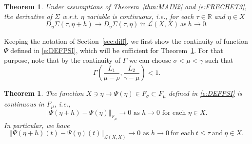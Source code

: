 \documentclass[a4paper,11pt,reqno]{amsart}
\theoremstyle{plain}
\newtheorem{thm}[lem]{Theorem}
\theoremstyle{definition}
\numberwithin{equation}{section}
\newcommand{\R}{\mathbb{R}}
\newcommand{\norm}[1]{\left\Vert#1\right\Vert}
\renewcommand{\leq}{\leqslant}
\begin{document}
\begin{thm}\label{thm:MAIN3}
Under assumptions of Theorem~\ref{thm:MAIN2} and \eqref{e:FRECHET3}, the derivative of $\Sigma$ w.r.t. $\eta$ variable is continuous, i.e., for each $\tau\in\R$ and $\eta\in X$
$$D_\eta\Sigma(\tau,\eta+h)\to D_\eta\Sigma(\tau,\eta)\ \text{in}\ \mathcal{L}(X,X)\ \text{as}\ h\to 0.$$
\end{thm}

Keeping the notation of Section~\ref{sec:diff}, we first show the continuity of function $\Psi$ defined in \eqref{e:DEFPSI}, which will be sufficient for Theorem~\ref{thm:MAIN3}.
For that purpose, note that by the continuity of $\Gamma$ we can choose $\sigma<\mu<\gamma$ such that 
\begin{equation*}%
\Gamma\left(\frac{L_1}{\mu-\rho},\frac{L_2}{\gamma-\mu}\right)<1.
\end{equation*}

\begin{thm}
The function $X\ni \eta\mapsto \Psi(\eta)\in F_\sigma\subset F_\mu$ defined in \eqref{e:DEFPSI} is continuous in $F_\mu$, i.e.,
$$\norm{\Psi(\eta+h)-\Psi(\eta)}_{F_\mu}\to 0\text{ as }h\to0\text{ for each }\eta\in X.$$ 
In particular, we have
\begin{equation}\label{e:CONTINFSIGMA}
\norm{\Psi(\eta+h)(t)-\Psi(\eta)(t)}_{\mathcal{L}(X,X)}\to0\text{ as }h\to0\ \text{for each}\ t\leq\tau\ \text{and}\ \eta\in X.
\end{equation}
\end{thm}
\end{document}
